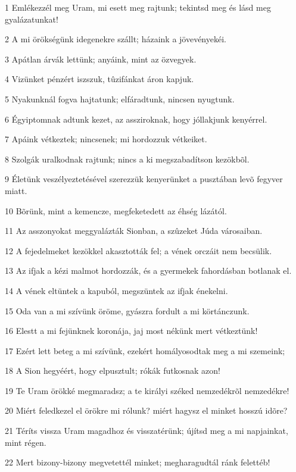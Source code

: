 \par 1 Emlékezzél meg Uram, mi esett meg rajtunk; tekintsd meg és lásd meg gyalázatunkat!
\par 2 A mi örökségünk idegenekre szállt; házaink a jövevényekéi.
\par 3 Apátlan árvák lettünk; anyáink, mint az özvegyek.
\par 4 Vizünket pénzért iszszuk, tûzifánkat áron kapjuk.
\par 5 Nyakunknál fogva hajtatunk; elfáradtunk, nincsen nyugtunk.
\par 6 Égyiptomnak adtunk kezet, az assziroknak, hogy jóllakjunk kenyérrel.
\par 7 Apáink vétkeztek; nincsenek; mi hordozzuk vétkeiket.
\par 8 Szolgák uralkodnak rajtunk; nincs a ki megszabadítson kezökbõl.
\par 9 Életünk veszélyeztetésével szerezzük kenyerünket a pusztában levõ fegyver miatt.
\par 10 Bõrünk, mint a kemencze, megfeketedett az éhség lázától.
\par 11 Az asszonyokat meggyalázták Sionban, a szûzeket Júda városaiban.
\par 12 A fejedelmeket kezökkel akasztották fel; a vének orczáit nem becsülik.
\par 13 Az ifjak a kézi malmot hordozzák, és a gyermekek fahordásban botlanak el.
\par 14 A vének eltüntek a kapuból, megszüntek az ifjak énekelni.
\par 15 Oda van a mi szívünk öröme, gyászra fordult a mi körtánczunk.
\par 16 Elestt a mi fejünknek koronája, jaj most nékünk mert vétkeztünk!
\par 17 Ezért lett beteg a mi szívünk, ezekért homályosodtak meg a mi szemeink;
\par 18 A Sion hegyéért, hogy elpusztult; rókák futkosnak azon!
\par 19 Te Uram örökké megmaradsz; a te királyi széked nemzedékrõl nemzedékre!
\par 20 Miért feledkezel el örökre mi rólunk? miért hagysz el minket hosszú idõre?
\par 21 Téríts vissza Uram magadhoz és visszatérünk; újítsd meg a mi napjainkat, mint régen.
\par 22 Mert bizony-bizony megvetettél minket; megharagudtál ránk felettéb!


